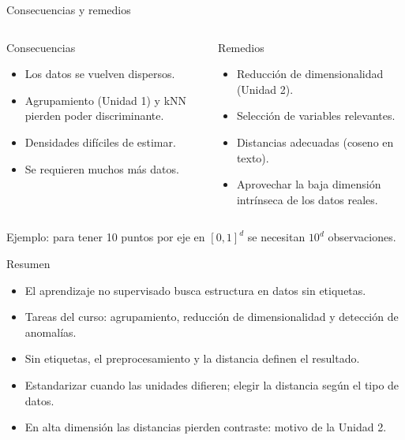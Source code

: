 \documentclass[aspectratio=169,11pt]{beamer}
\begin{document}
\begin{frame}{Consecuencias y remedios}
  \begin{columns}[T]
    \begin{alertblock}{Consecuencias}
      \begin{itemize}
        \item Los datos se vuelven dispersos.
        \item Agrupamiento (Unidad 1) y kNN pierden poder discriminante.
        \item Densidades difíciles de estimar.
        \item Se requieren muchos más datos.
      \end{itemize}
    \end{alertblock}
    \begin{exampleblock}{Remedios}
      \begin{itemize}
        \item Reducción de dimensionalidad (Unidad 2).
        \item Selección de variables relevantes.
        \item Distancias adecuadas (coseno en texto).
        \item Aprovechar la baja dimensión intrínseca de los datos reales.
      \end{itemize}
    \end{exampleblock}
  \end{columns}
  \vspace{6pt}
  {\small Ejemplo: para tener 10 puntos por eje en $[0,1]^d$ se necesitan $10^d$ observaciones.}
\end{frame}

% 

\begin{frame}{Resumen}
  \begin{itemize}
    \item El aprendizaje no supervisado busca estructura en datos sin etiquetas.
    \item Tareas del curso: agrupamiento, reducción de dimensionalidad y detección de anomalías.
    \item Sin etiquetas, \alert{el preprocesamiento y la distancia definen el resultado}.
    \item Estandarizar cuando las unidades difieren; elegir la distancia según el tipo de datos.
    \item En alta dimensión las distancias pierden contraste: motivo de la Unidad 2.
  \end{itemize}
\end{frame}
\end{document}
